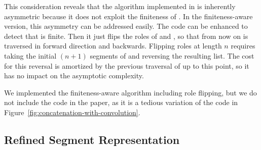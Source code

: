 This consideration reveals that the algorithm implemented in
 is inherently asymmetric because it does not
exploit the finiteness of . In the finiteness-aware version, this asymmetry can be
addressed easily.  The code can be
enhanced to detect that  is finite. Then it just flips the roles of
 and , so that from now on  is traversed in 
forward direction and  backwards. Flipping roles at length $n$ requires taking
the initial $(n+1)$ segments of  and reversing the resulting
list. The cost for this reversal is amortized by the previous traversal of
 up to this point, so it has no impact on the asymptotic
complexity.

We implemented the finiteness-aware algorithm including role flipping,
but we do not include the code in the paper, as it is a
tedious variation of the code in
Figure~\ref{fig:concatenation-with-convolution}. 





\subsection{Refined Segment Representation}
\label{sec:segm-repr}

